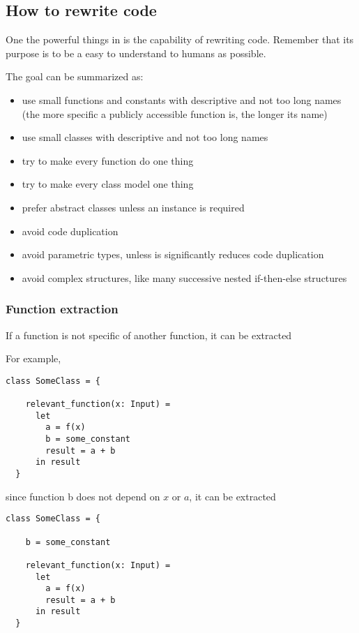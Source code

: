 \subsection{How to rewrite \Soda code}

One the powerful things in \Soda is the capability of rewriting code.
Remember that its purpose is to be a easy to understand to humans as possible.

The goal can be summarized as:

\begin{itemize}
    \item use small functions and constants with descriptive and not too long names
    (the more specific a publicly accessible function is, the longer its name)
    \item use small classes with descriptive and not too long names
    \item try to make every function do one thing
    \item try to make every class model one thing
    \item prefer abstract classes unless an instance is required
    \item avoid code duplication
    \item avoid parametric types, unless is significantly reduces code duplication
    \item avoid complex structures, like many successive nested if-then-else structures
\end{itemize}

\subsubsection{Function extraction}

If a function is not specific of another function, it can be extracted

For example,

\begin{lstlisting}[label={lst:rewritingFunctionExtractionBefore}]
  class SomeClass = {

    relevant_function(x: Input) =
      let
        a = f(x)
        b = some_constant
        result = a + b
      in result
  }
\end{lstlisting}

since function b does not depend on $x$ or $a$, it can be extracted

\begin{lstlisting}[label={lst:rewritingFunctionExtractionAfter0}]
  class SomeClass = {

    b = some_constant

    relevant_function(x: Input) =
      let
        a = f(x)
        result = a + b
      in result
  }
\end{lstlisting}

